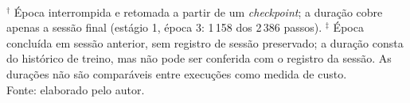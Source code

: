 \begin{table}[htbp]
  \centering
  \caption{Two-Stage, estágio 1 (relação $\times$ \texttt{no\_relation}) no DEV completo: perdas, AP, precisão e \emph{recall} de \texttt{relacao}, \emph{recall} nos pares \texttt{negation\_of} e duração. $\ast$ época selecionada (maior AP).}
  \label{tab:dev_estagio1}
\\[2pt]
  {\footnotesize $^{\dagger}$ Época interrompida e retomada a partir de um \emph{checkpoint}; a duração cobre apenas a sessão final (estágio 1, época 3: 1\,158 dos 2\,386 passos). $^{\ddagger}$ Época concluída em sessão anterior, sem registro de sessão preservado; a duração consta do histórico de treino, mas não pode ser conferida com o registro da sessão. As durações não são comparáveis entre execuções como medida de custo.}\\[4pt]
  {\footnotesize Fonte: elaborado pelo autor.}
\end{table}
